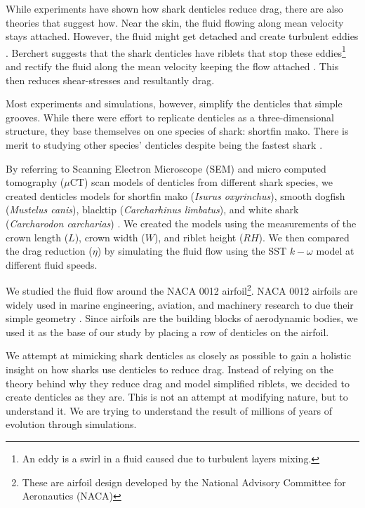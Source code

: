 \documentclass[graybox]{svmult}
\begin{document}
While experiments have shown how shark denticles reduce drag, there are also theories that suggest how. Near the skin, the fluid flowing along mean velocity stays attached. However, the fluid might get detached and create turbulent eddies \cite{bechert_experiments_1997}. Berchert suggests that the shark denticles have riblets that stop these eddies\footnote{An eddy is a swirl in a fluid caused due to turbulent layers mixing.} and rectify the fluid along the mean velocity keeping the flow attached \cite{guo_experimental_2023}. This then reduces shear-stresses and resultantly drag.

Most experiments and simulations, however, simplify the denticles that simple grooves. While there were effort to replicate denticles as a three-dimensional structure, they base themselves on one species of shark: shortfin mako. There is merit to studying other species' denticles despite being the fastest shark \cite{graybill_experimental_2024}.

By referring to Scanning Electron Microscope (SEM) and micro computed tomography ($\mu$CT) scan models of denticles from different shark species, we created denticles models for shortfin mako (\textit{Isurus oxyrinchus}), smooth dogfish (\textit{Mustelus canis}), blacktip (\textit{Carcharhinus limbatus}), and white shark (\textit{Carcharodon carcharias}) \cite{ankhelyi_diversity_2018}. We created the models using the measurements of the crown length ($L$), crown width ($W$), and riblet height ($RH$). We then compared the drag reduction ($\eta$) by simulating the fluid flow using the SST $k-\omega$ model at different fluid speeds.

We studied the fluid flow around the NACA 0012 airfoil\footnote{These are airfoil design developed by the National Advisory Committee for Aeronautics (NACA)}. NACA 0012 airfoils are widely used in marine engineering, aviation, and machinery research to due their simple geometry \cite{guo_experimental_2023, zhang_numerical_2018}. Since airfoils are the building blocks of aerodynamic bodies, we used it as the base of our study by placing a row of denticles on the airfoil.

We attempt at mimicking shark denticles as closely as possible to gain a holistic insight on how sharks use denticles to reduce drag. Instead of relying on the theory behind why they reduce drag and model simplified riblets, we decided to create denticles as they are. This is not an attempt at modifying nature, but to understand it. We are trying to understand the result of millions of years of evolution through simulations.
\end{document}
